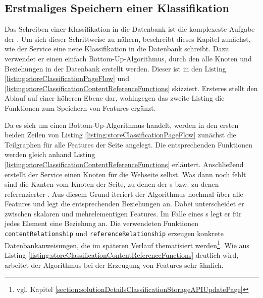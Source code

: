 \subsection{Erstmaliges Speichern einer Klassifikation}
    \label{section:solutionDetailsStorageAPIInitialWrite}
    Das Schreiben einer Klassifikation in die Datenbank ist die
    komplexeste Aufgabe der {\classificationStorageAPI}.
    Um sich dieser Schrittweise zu nähern, beschreibt dieses Kapitel zunächst,
    wie der Service eine neue Klassifikation in die Datenbank schreibt.
    Dazu verwendet er einen
    einfach Bottom-Up-Algorithmus, durch den alle Knoten und Beziehungen
    in der Datenbank erstellt werden.
    Dieser ist in den Listing \ref{listing:storeClassificationPageFlow} und
    \ref{listing:storeClassificationContentReferenceFunctions} skizziert.
    Ersteres stellt den Ablauf auf einer höheren Ebene dar, wohingegen
    das zweite Listing die Funktionen zum Speichern von Features ergänzt.
    
    

    Da es sich um einen Bottom-Up-Algorithmus handelt,
    werden in den ersten beiden Zeilen von Listing \ref{listing:storeClassificationPageFlow}
    zunächst die Teilgraphen für alle Features der Seite angelegt.
    Die entsprechenden Funktionen werden gleich anhand Listing \ref{listing:storeClassificationContentReferenceFunctions} erläutert.
    Anschließend erstellt der Service einen Knoten für die Webseite selbst.
    Was dann noch fehlt sind die Kanten vom Knoten der Seite,
    zu denen der {\contentFeature}s bzw. zu denen referenzierter {\resources}.
    Aus diesem Grund iteriert der Algorithmus nochmal über alle Features
    und legt die entsprechenden Beziehungen an.
    Dabei unterscheidet er zwischen skalaren und mehrelementigen Features.
    Im Falle eines {\collectionFeature}s legt er für jedes Element eine Beziehung an.
    Die verwendeten Funktionen \texttt{contentRelationship} und \texttt{referenceRelationship}
    erzeugen konkrete Datenbankanweisungen, die im späteren Verlauf thematisiert
    werden\footnote{vgl. Kapitel \ref{section:solutionDetailsClassificationStorageAPIUpdatePage}}.
    Wie aus Listing \ref{listing:storeClassificationContentReferenceFunctions} deutlich wird,
    arbeitet der Algorithmus bei der Erzeugung von Features sehr ähnlich.

